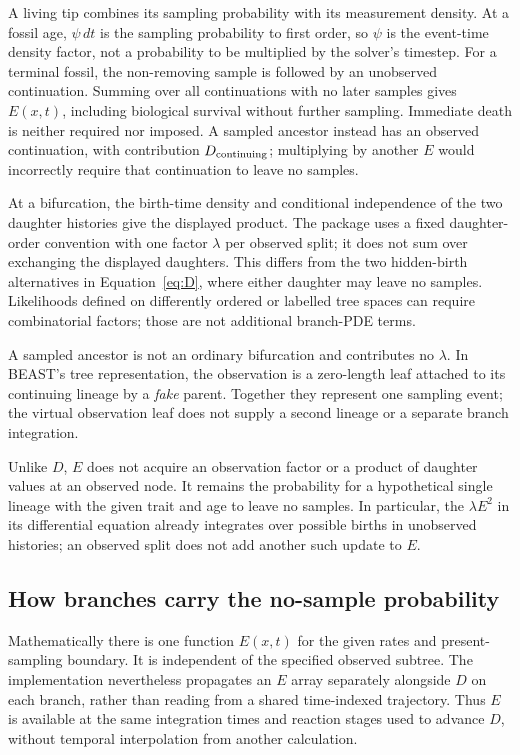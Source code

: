 \documentclass[11pt]{article}
\begin{document}
A living tip combines its sampling probability with its measurement density. At a fossil age,
$\psi\,dt$ is the sampling probability to first order, so $\psi$ is the event-time density factor,
not a probability to be multiplied by the solver's timestep. For a terminal fossil, the
non-removing sample is followed by an unobserved continuation. Summing over all continuations
with no later samples gives $E(x,t)$, including biological survival without further sampling.
Immediate death is neither required nor imposed. A sampled ancestor instead has an observed
continuation, with contribution $D_{\rm continuing}$; multiplying by another $E$ would incorrectly
require that continuation to leave no samples.

At a bifurcation, the birth-time density and conditional independence of the two daughter
histories give the displayed product. The package uses a fixed daughter-order convention with
one factor $\lambda$ per observed split; it does not sum over exchanging the displayed daughters.
This differs from the two hidden-birth alternatives in Equation~\eqref{eq:D}, where either
daughter may leave no samples. Likelihoods defined on differently ordered or labelled tree
spaces can require combinatorial factors; those are not additional branch-PDE terms.

A sampled ancestor is not an ordinary bifurcation and contributes no $\lambda$.
In BEAST's tree representation, the observation is a zero-length leaf attached to its
continuing lineage by a \emph{fake} parent. Together they represent one sampling event; the
virtual observation leaf does not supply a second lineage or a separate branch integration.

Unlike $D$, $E$ does not acquire an observation factor or a product of daughter values at an
observed node. It remains the probability for a hypothetical single lineage with the given
trait and age to leave no samples. In particular, the $\lambda E^2$ in its differential
equation already integrates over possible births in unobserved histories; an observed split
does not add another such update to $E$.

\subsection{How branches carry the no-sample probability}\label{sec:branch-E}
Mathematically there is one function $E(x,t)$ for the given rates and present-sampling boundary.
It is independent of the specified observed subtree. The implementation nevertheless propagates
an $E$ array separately alongside $D$ on each branch, rather than reading from a shared
time-indexed trajectory. Thus $E$ is available at the same integration times and reaction stages
used to advance $D$, without temporal interpolation from another calculation.
\end{document}
